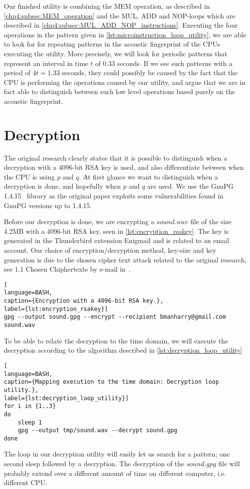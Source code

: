 Our finished utility is combining the MEM operation, as described in \autoref{chp4:subsec:MEM_operation} and the MUL, ADD and NOP-loops which are described in \autoref{chp4:subsec:MUL_ADD_NOP_instructions}.
Executing the four operations in the pattern given in \autoref{lst:microinstruction_loop_utility}, we are able to look for for repeating patterns in the acoustic fingerprint of the CPUs executing the utility.
More precisely, we will look for periodic patterns that represent an interval in time \(t\) of \(0.33\) seconds. 
If we see such patterns with a period of \(4t = 1.33\) seconds, they could possibly be caused by the fact that the CPU is performing the operations caused by our utility, and argue that we are in fact able to distinguish between such low level operations based purely on the acoustic fingerprint. 



\section{Decryption}\label{chp4:sec:decryption}

The original research clearly states that it is possible to distinguish when a decryption with a 4096-bit RSA key is used, and also differentiate between when the CPU is using \(p\) and \(q\).
At first glance we want to distinguish when a decryption is done, and hopefully when \(p\) and \(q\) are used. 
We use the GnuPG 1.4.15~\cite{url:GnuPG_1.4.15} library as the original paper exploits some vulnerabilities found in GnuPG versions up to 1.4.15. 

Before our decryption is done, we are encrypting a \(sound.wav\) file of the size 4.2MB with a 4096-bit RSA key, seen in \autoref{lst:encryption_rsakey}. The key is generated in the Thunderbird extension Enigmail and is related to an email account.
Our choice of encryption/decryption method, key-size and key generation is due to the chosen cipher text attack related to the original research, see 1.1 Chosen Chiphertexts by e-mail in~\cite{DBLP:conf/crypto/GenkinST14}. 
\begin{lstlisting}[
language=BASH, 
caption={Encryption with a 4096-bit RSA key.}, 
label={lst:encryption_rsakey}]
gpg --output sound.gpg --encrypt --recipient bmanharry@gmail.com sound.wav
\end{lstlisting}

To be able to relate the decryption to the time domain, we will execute the decryption according to the algorithm described in \autoref{lst:decryption_loop_utility}

\begin{lstlisting}[
language=BASH, 
caption={Mapping execution to the time domain: Decryption loop utility.}, 
label={lst:decryption_loop_utility}]
for i in {1..3}
do
    sleep 1
    gpg --output tmp/sound.wav --decrypt sound.gpg
done
\end{lstlisting}

The loop in our decryption utility will easily let us search for a pattern; one second sleep followed by a decryption. 
The decryption of the \(sound.gpg\) file will probably extend over a different amount of time on different computer, i.e. different CPU. 
